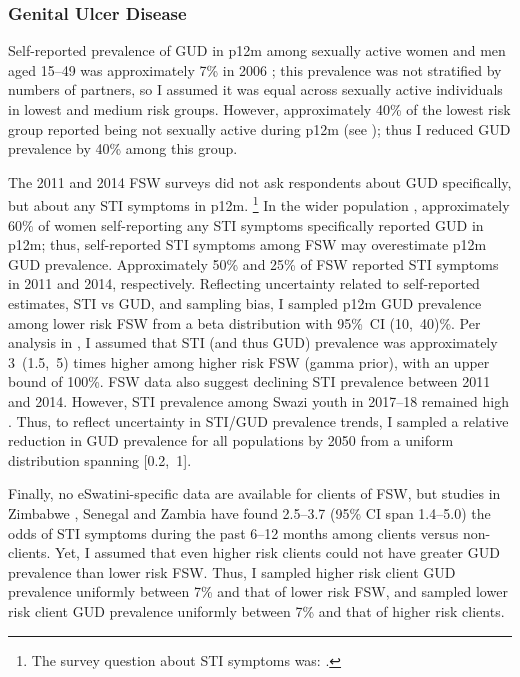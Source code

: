 \subsubsection{Genital Ulcer Disease}\label{model.par.tm.gud}
Self-reported prevalence of GUD in p12m among sexually active women and men aged 15--49
was approximately 7\% in 2006 \cite[Table~13.14]{SDHS2006};
this prevalence was not stratified by numbers of partners, so I assumed it was equal across
sexually active individuals in lowest and medium risk groups.
However, approximately 40\% of the lowest risk group %
reported being not sexually active during p12m \cite{SDHS2006,SHIMS2} (see );
thus I reduced GUD prevalence by 40\% among this group.
\par
The 2011 and 2014 FSW surveys did not ask respondents about GUD specifically,
but about any STI symptoms in p12m.%
\footnote{The survey question about STI symptoms was:
  .}
In the wider population \cite{SDHS2006},
approximately 60\% of women self-reporting any STI symptoms specifically reported GUD in p12m;
thus, self-reported STI symptoms among FSW may overestimate p12m GUD prevalence.
Approximately 50\% and 25\% of FSW reported STI symptoms in 2011 and 2014, respectively.
Reflecting uncertainty related to self-reported estimates, STI vs GUD, and sampling bias,
I sampled p12m GUD prevalence among lower risk FSW from
a beta distribution with 95\%~CI (10,~40)\%.
Per analysis in , I assumed that STI (and thus GUD) prevalence was
approximately 3~(1.5,~5) times higher among higher risk FSW (gamma prior),
with an upper bound of 100\%.
FSW data also suggest declining STI prevalence between 2011 and 2014.
However, STI prevalence among Swazi youth in 2017--18 remained high \cite{Jasumback2020}.
Thus, to reflect uncertainty in STI/GUD prevalence trends,
I sampled a relative reduction in GUD prevalence for all populations by 2050
from a uniform distribution spanning [0.2,~1].
\par
Finally, no eSwatini-specific data are available for clients of FSW,
but studies in Zimbabwe \cite{Cowan2005}, Senegal \cite{Santo2005} and Zambia \cite{Carrasco2020}
have found 2.5--3.7 (95\% CI span 1.4--5.0) the odds
of STI symptoms during the past 6--12 months among clients versus non-clients.
Yet, I assumed that even higher risk clients
could not have greater GUD prevalence than lower risk FSW.
Thus, I sampled higher risk client GUD prevalence uniformly between 7\% and that of lower risk FSW,
and sampled lower risk client GUD prevalence uniformly between 7\% and that of higher risk clients.